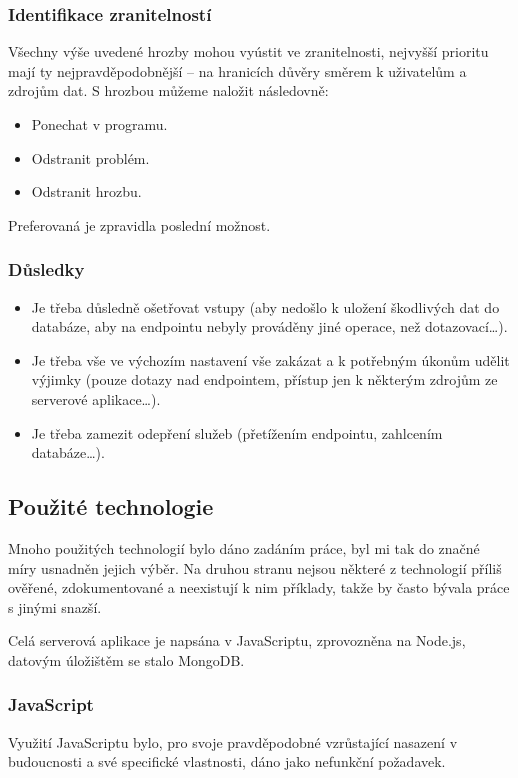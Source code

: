 \subsubsection{Identifikace zranitelností}
Všechny výše uvedené hrozby mohou vyústit ve zranitelnosti, nejvyšší prioritu mají ty nejpravděpodobnější -- na hranicích důvěry směrem k uživatelům a zdrojům dat. S hrozbou můžeme naložit následovně:
\begin{itemize}
 \item Ponechat v programu.
 \item Odstranit problém.
 \item Odstranit hrozbu.
\end{itemize}
Preferovaná je zpravidla poslední možnost.

\subsubsection{Důsledky}
\begin{itemize}
 \item Je třeba důsledně ošetřovat vstupy (aby nedošlo k uložení škodlivých dat do databáze, aby na  endpointu nebyly prováděny jiné operace, než dotazovací\dots).
 \item Je třeba vše ve výchozím nastavení vše zakázat a k potřebným úkonům udělit výjimky (pouze dotazy nad  endpointem, přístup jen k některým zdrojům ze serverové aplikace\dots).
 \item Je třeba zamezit odepření služeb (přetížením  endpointu, zahlcením databáze\dots).
\end{itemize}


\subsection{Použité technologie}
\label{sec:server:technologies}
Mnoho použitých technologií bylo dáno zadáním práce, byl mi tak do značné míry usnadněn jejich výběr. Na druhou stranu nejsou některé z technologií příliš ověřené, zdokumentované a neexistují k nim příklady, takže by často bývala práce s jinými snazší.

Celá serverová aplikace je napsána v JavaScriptu, zprovozněna na Node.js, datovým úložištěm se stalo MongoDB.

\subsubsection{JavaScript}
Využití JavaScriptu bylo, pro svoje pravděpodobné vzrůstající nasazení v budoucnosti a své specifické vlastnosti, dáno jako nefunkční požadavek.

